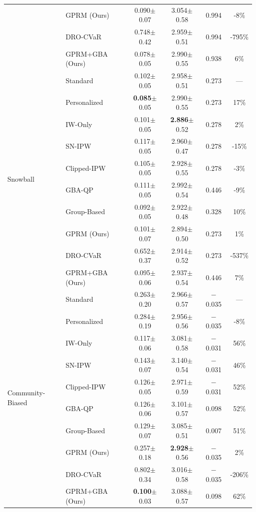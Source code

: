 \documentclass{article}
\theoremstyle{plain}
\theoremstyle{definition}
\theoremstyle{remark}
\begin{document}
\begin{table}[h]
\begin{tabular}{llcccc}
& GPRM (Ours) & 0.090{\tiny$\pm$0.07} & 3.054{\tiny$\pm$0.58} & 0.994 & -8\% \\
& DRO-CVaR & 0.748{\tiny$\pm$0.42} & 2.959{\tiny$\pm$0.51} & 0.994 & -795\% \\
& GPRM+GBA (Ours) & 0.078{\tiny$\pm$0.05} & 2.990{\tiny$\pm$0.55} & 0.938 & 6\% \\
\midrule
\multirow{10}{*}{Snowball}
& Standard & 0.102{\tiny$\pm$0.05} & 2.958{\tiny$\pm$0.51} & 0.273 & --- \\
& Personalized & \textbf{0.085}{\tiny$\pm$0.05} & 2.990{\tiny$\pm$0.55} & 0.273 & 17\% \\
& IW-Only & 0.101{\tiny$\pm$0.05} & \textbf{2.886}{\tiny$\pm$0.52} & 0.278 & 2\% \\
& SN-IPW & 0.117{\tiny$\pm$0.05} & 2.960{\tiny$\pm$0.47} & 0.278 & -15\% \\
& Clipped-IPW & 0.105{\tiny$\pm$0.05} & 2.928{\tiny$\pm$0.55} & 0.278 & -3\% \\
& GBA-QP & 0.111{\tiny$\pm$0.05} & 2.992{\tiny$\pm$0.54} & 0.446 & -9\% \\
& Group-Based & 0.092{\tiny$\pm$0.05} & 2.922{\tiny$\pm$0.48} & 0.328 & 10\% \\
& GPRM (Ours) & 0.101{\tiny$\pm$0.07} & 2.894{\tiny$\pm$0.50} & 0.273 & 1\% \\
& DRO-CVaR & 0.652{\tiny$\pm$0.37} & 2.914{\tiny$\pm$0.52} & 0.273 & -537\% \\
& GPRM+GBA (Ours) & 0.095{\tiny$\pm$0.06} & 2.937{\tiny$\pm$0.54} & 0.446 & 7\% \\
\midrule
\multirow{10}{*}{Community-Biased}
& Standard & 0.263{\tiny$\pm$0.20} & 2.966{\tiny$\pm$0.57} & $-$0.035 & --- \\
& Personalized & 0.284{\tiny$\pm$0.19} & 2.956{\tiny$\pm$0.56} & $-$0.035 & -8\% \\
& IW-Only & 0.117{\tiny$\pm$0.06} & 3.081{\tiny$\pm$0.58} & $-$0.031 & 56\% \\
& SN-IPW & 0.143{\tiny$\pm$0.07} & 3.140{\tiny$\pm$0.54} & $-$0.031 & 46\% \\
& Clipped-IPW & 0.126{\tiny$\pm$0.05} & 2.971{\tiny$\pm$0.59} & $-$0.031 & 52\% \\
& GBA-QP & 0.126{\tiny$\pm$0.06} & 3.101{\tiny$\pm$0.57} & 0.098 & 52\% \\
& Group-Based & 0.129{\tiny$\pm$0.07} & 3.085{\tiny$\pm$0.51} & 0.007 & 51\% \\
& GPRM (Ours) & 0.257{\tiny$\pm$0.18} & \textbf{2.928}{\tiny$\pm$0.56} & $-$0.035 & 2\% \\
& DRO-CVaR & 0.802{\tiny$\pm$0.34} & 3.016{\tiny$\pm$0.58} & $-$0.035 & -206\% \\
& GPRM+GBA (Ours) & \textbf{0.100}{\tiny$\pm$0.03} & 3.088{\tiny$\pm$0.57} & 0.098 & 62\% \\
\bottomrule
\end{tabular}
\end{table}
\end{document}
